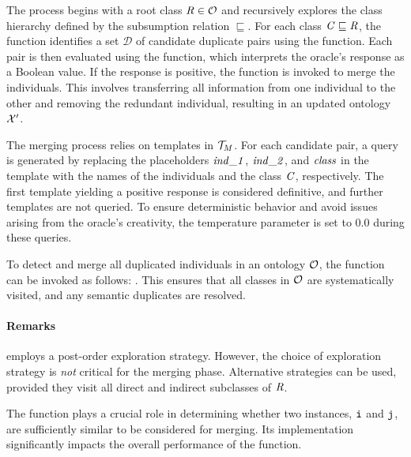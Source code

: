 The process begins with a root class $\concept{R} \in \relset{O}$ and recursively explores the class hierarchy defined by the subsumption relation $\sqsubseteq$.
%
For each class $\concept{C} \sqsubseteq \concept{R}$, the function identifies a set $\mathcal{D}$ of candidate duplicate pairs using the \synSimilar{} function.
%
Each pair is then evaluated using the \extractBinary{} function, which interprets the oracle's response as a Boolean value.
%
If the response is positive, the \mergeInst{} function is invoked to merge the individuals.
%
This involves transferring all information from one individual to the other and removing the redundant individual, resulting in an updated ontology $\relset{X}'$.


The merging process relies on templates in $\relset{T}_{M}$.
%
For each candidate pair, a query is generated by replacing the placeholders $\mathit{ind\_1}$, $\mathit{ind\_2}$, and $\mathit{class}$ in the template with the names of the individuals and the class $\concept{C}$, respectively.
%
The first template yielding a positive response is considered definitive, and further templates are not queried.
%
To ensure deterministic behavior and avoid issues arising from the oracle's creativity, the temperature parameter is set to 0.0 during these queries.


To detect and merge all duplicated individuals in an ontology $\relset{O}$, the function can be invoked as follows:
%
.
%
This ensures that all classes in $\relset{O}$ are systematically visited, and any semantic duplicates are resolved.


\paragraph{Remarks}
%
 employs a post-order exploration strategy.
%
However, the choice of exploration strategy is \emph{not} critical for the merging phase.
%
Alternative strategies can be used, provided they visit all direct and indirect subclasses of $\concept{R}$.

%
The \synSimilar{} function plays a crucial role in determining whether two instances, $\instance{i}$ and $\instance{j}$, are sufficiently similar to be considered for merging.
%
Its implementation significantly impacts the overall performance of the \merge{} function.
%

